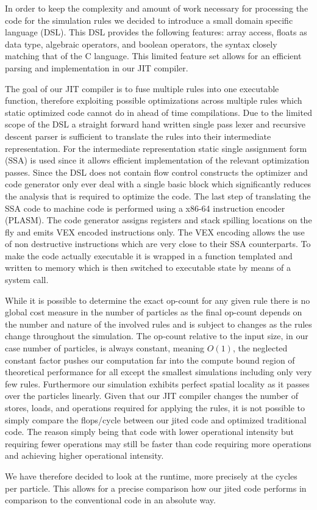 In order to keep the complexity and amount of work necessary for processing the code for the simulation rules we decided to introduce a small domain specific language (DSL). This DSL provides the following features: array access, floats as data type, algebraic operators, and boolean operators, the syntax closely matching that of the C language. This limited feature set allows for an efficient parsing and implementation in our JIT compiler.

The goal of our JIT compiler is to fuse multiple rules into one executable function, therefore exploiting possible optimizations across multiple rules which static optimized code cannot do in ahead of time compilations. Due to the limited scope of the DSL a straight forward hand written single pass lexer and recursive descent parser is sufficient to translate the rules into their intermediate representation. For the intermediate representation static single assignment form (SSA) is used since it allows efficient implementation of the relevant optimization passes. Since the DSL does not contain flow control constructs the optimizer and code generator only ever deal with a single basic block which significantly reduces the analysis that is required to optimize the code. The last step of translating the SSA code to machine code is performed using a x86-64 instruction encoder (PLASM). The code generator assigns registers and stack spilling locations on the fly and emits VEX encoded instructions only. The VEX encoding allows the use of non destructive instructions which are very close to their SSA counterparts. To make the code actually executable it is wrapped in a function templated and written to memory which is then switched to executable state by means of a system call.


While it is possible to determine the exact op-count for any given rule there is no global cost measure in the number of particles as the final op-count depends on the number and nature of the involved rules and is subject to changes as the rules change throughout the simulation. The op-count relative to the input size, in our case number of particles, is always constant, meaning $O(1)$, the neglected constant factor pushes our computation far into the compute bound region of theoretical performance for all except the smallest simulations including only very few rules. Furthermore our simulation exhibits perfect spatial locality as it passes over the particles linearly.
Given that our JIT compiler changes the number of stores, loads, and operations required for applying the rules, it is not possible to simply compare the flops/cycle between our jited code and optimized traditional code. The reason simply being that code with lower operational intensity but requiring fewer operations may still be faster than code requiring more operations and achieving higher operational intensity.

We have therefore decided to look at the runtime, more precisely at the cycles per particle. This allows for a precise comparison how our jited code performs in comparison to the conventional code in an absolute way.
